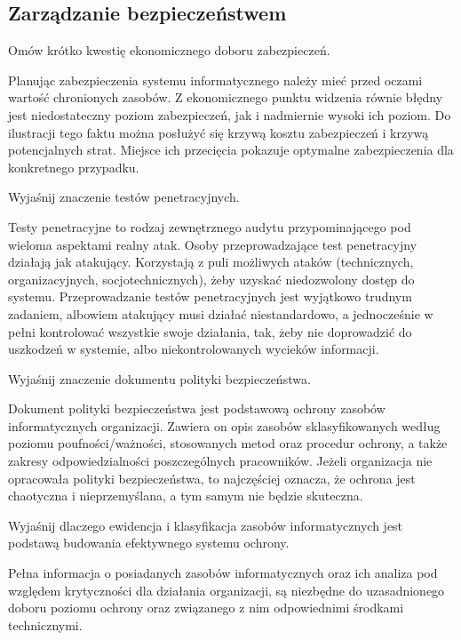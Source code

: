 \documentclass[answers,11pt]{exam}
\begin{document}
\subsection{Zarządzanie bezpieczeństwem}

\begin{questions}

\question Omów krótko kwestię ekonomicznego doboru zabezpieczeń.
\begin{solution}
Planując zabezpieczenia systemu informatycznego należy mieć przed oczami wartość chronionych zasobów. Z ekonomicznego punktu widzenia równie błędny jest niedostateczny poziom zabezpieczeń, jak i nadmiernie wysoki ich poziom. Do ilustracji tego faktu można posłużyć się krzywą kosztu zabezpieczeń i krzywą potencjalnych strat. Miejsce ich przecięcia pokazuje optymalne zabezpieczenia dla konkretnego przypadku. 
\end{solution}

\question Wyjaśnij znaczenie testów penetracyjnych.
\begin{solution}
Testy penetracyjne to rodzaj zewnętrznego audytu przypominającego pod wieloma aspektami realny atak. Osoby przeprowadzające test penetracyjny działają jak atakujący. Korzystają z puli możliwych ataków (technicznych, organizacyjnych, socjotechnicznych), żeby uzyskać niedozwolony dostęp do systemu. Przeprowadzanie testów penetracyjnych jest wyjątkowo trudnym zadaniem, albowiem atakujący musi działać niestandardowo, a jednocześnie w pełni kontrolować wszystkie swoje działania, tak, żeby nie doprowadzić do uszkodzeń w systemie, albo niekontrolowanych wycieków informacji.
\end{solution}

\question Wyjaśnij znaczenie dokumentu polityki bezpieczeństwa.
\begin{solution}
Dokument polityki bezpieczeństwa jest podstawową ochrony zasobów informatycznych organizacji. Zawiera on opis zasobów sklasyfikowanych według poziomu poufności/ważności, stosowanych metod oraz procedur ochrony, a także zakresy odpowiedzialności poszczególnych pracowników. 
Jeżeli organizacja nie opracowała polityki bezpieczeństwa, to najczęściej oznacza, że ochrona jest chaotyczna i nieprzemyślana, a tym samym nie będzie skuteczna.
\end{solution}


\question Wyjaśnij dlaczego ewidencja i klasyfikacja zasobów informatycznych jest podstawą budowania efektywnego systemu ochrony.
\begin{solution}
Pełna informacja o posiadanych zasobów informatycznych oraz ich analiza pod względem krytyczności dla działania organizacji, są niezbędne do uzasadnionego doboru poziomu ochrony oraz związanego z nim odpowiednimi środkami technicznymi. 


\end{solution}
\end{questions}
\end{document}
